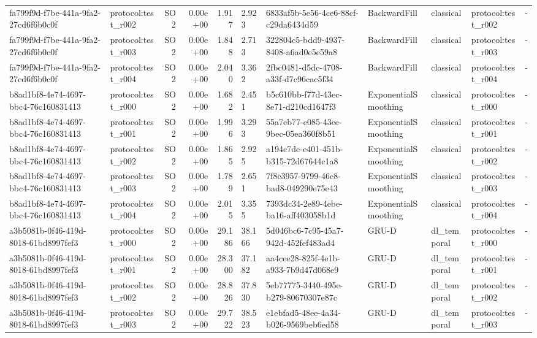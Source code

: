 \begin{table}[htbp]
\begin{tabular}{llrrr}
fa799f9d-f7be-441a-9fa2-27cd6f6b0c0f & protocol:test\_r002 & SO2 & 0.00e+00 & 1.917 & 2.923 & 6833af5b-5e56-4ce6-88cf-c29da6434d59 & BackwardFill & classical & protocol:test\_r002 & - \\
fa799f9d-f7be-441a-9fa2-27cd6f6b0c0f & protocol:test\_r003 & SO2 & 0.00e+00 & 1.848 & 2.713 & 322804c5-bdd9-4937-8408-a6ad0e5e59a8 & BackwardFill & classical & protocol:test\_r003 & - \\
fa799f9d-f7be-441a-9fa2-27cd6f6b0c0f & protocol:test\_r004 & SO2 & 0.00e+00 & 2.040 & 3.362 & 2fbc0481-d5dc-4708-a33f-d7c96cac5f34 & BackwardFill & classical & protocol:test\_r004 & - \\
b8ad1bf8-4e74-4697-bbc4-76c160831413 & protocol:test\_r000 & SO2 & 0.00e+00 & 1.682 & 2.451 & b5c610bb-f77d-43ec-8e71-d210cd1647f3 & ExponentialSmoothing & classical & protocol:test\_r000 & - \\
b8ad1bf8-4e74-4697-bbc4-76c160831413 & protocol:test\_r001 & SO2 & 0.00e+00 & 1.996 & 3.293 & 55a7eb77-e085-43ee-9bec-05ea360f8b51 & ExponentialSmoothing & classical & protocol:test\_r001 & - \\
b8ad1bf8-4e74-4697-bbc4-76c160831413 & protocol:test\_r002 & SO2 & 0.00e+00 & 1.865 & 2.925 & a194c7de-e401-451b-b315-72d67644c1a8 & ExponentialSmoothing & classical & protocol:test\_r002 & - \\
b8ad1bf8-4e74-4697-bbc4-76c160831413 & protocol:test\_r003 & SO2 & 0.00e+00 & 1.789 & 2.651 & 7f8c3957-9799-46e8-bad8-049290e75e43 & ExponentialSmoothing & classical & protocol:test\_r003 & - \\
b8ad1bf8-4e74-4697-bbc4-76c160831413 & protocol:test\_r004 & SO2 & 0.00e+00 & 2.015 & 3.355 & 7393dc34-2e89-4ebe-ba16-aff403058b1d & ExponentialSmoothing & classical & protocol:test\_r004 & - \\
a3b5081b-0f46-419d-8018-61bd8997fef3 & protocol:test\_r000 & SO2 & 0.00e+00 & 29.186 & 38.166 & 5d046bc6-7c95-45a7-942d-452fef483ad4 & GRU-D & dl\_temporal & protocol:test\_r000 & - \\
a3b5081b-0f46-419d-8018-61bd8997fef3 & protocol:test\_r001 & SO2 & 0.00e+00 & 28.300 & 37.182 & aa4cee28-825f-4e1b-a933-7b9d47d068e9 & GRU-D & dl\_temporal & protocol:test\_r001 & - \\
a3b5081b-0f46-419d-8018-61bd8997fef3 & protocol:test\_r002 & SO2 & 0.00e+00 & 28.826 & 37.830 & 5eb77775-3440-495e-b279-80670307e87c & GRU-D & dl\_temporal & protocol:test\_r002 & - \\
a3b5081b-0f46-419d-8018-61bd8997fef3 & protocol:test\_r003 & SO2 & 0.00e+00 & 29.722 & 38.523 & e1ebfad5-48ee-4a34-b026-9569beb6ed58 & GRU-D & dl\_temporal & protocol:test\_r003 & - \\

\end{tabular}
\end{table}
